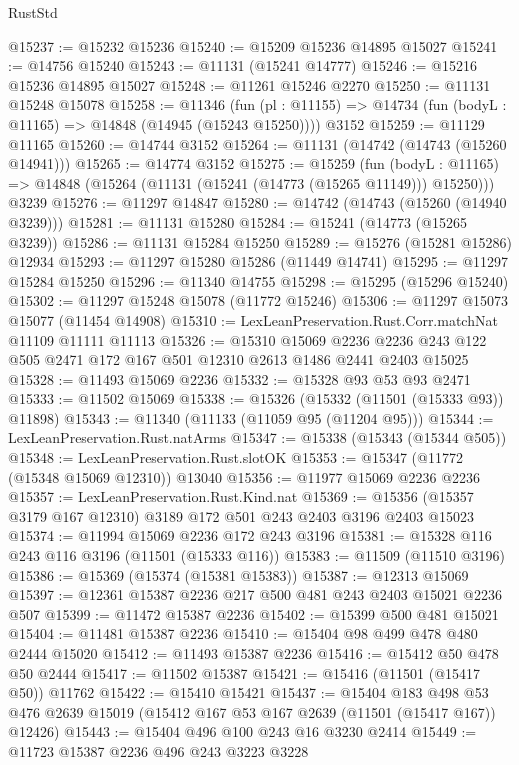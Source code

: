 \begin{lexlean}{RustStd}
\begin{coremodule}
@15237 := @15232 @15236
@15240 := @15209 @15236 @14895 @15027
@15241 := @14756 @15240
@15243 := @11131 (@15241 @14777)
@15246 := @15216 @15236 @14895 @15027
@15248 := @11261 @15246 @2270
@15250 := @11131 @15248 @15078
@15258 := @11346
    (fun (pl : @11155) => @14734 (fun (bodyL : @11165) => @14848 (@14945 (@15243 @15250))))
    @3152
@15259 := @11129 @11165
@15260 := @14744 @3152
@15264 := @11131 (@14742 (@14743 (@15260 @14941)))
@15265 := @14774 @3152
@15275 := @15259
    (fun (bodyL : @11165) => @14848 (@15264 (@11131 (@15241 (@14773 (@15265 @11149))) @15250)))
    @3239
@15276 := @11297 @14847
@15280 := @14742 (@14743 (@15260 (@14940 @3239)))
@15281 := @11131 @15280
@15284 := @15241 (@14773 (@15265 @3239))
@15286 := @11131 @15284 @15250
@15289 := @15276 (@15281 @15286) @12934
@15293 := @11297 @15280 @15286 (@11449 @14741)
@15295 := @11297 @15284 @15250
@15296 := @11340 @14755
@15298 := @15295 (@15296 @15240)
@15302 := @11297 @15248 @15078 (@11772 @15246)
@15306 := @11297 @15073 @15077 (@11454 @14908)
@15310 := LexLeanPreservation.Rust.Corr.matchNat @11109 @11111 @11113
@15326 := @15310
    @15069
    @2236
    @2236
    @243
    @122
    @505
    @2471
    @172
    @167
    @501
    @12310
    @2613
    @1486
    @2441
    @2403
    @15025
@15328 := @11493 @15069 @2236
@15332 := @15328 @93 @53 @93 @2471
@15333 := @11502 @15069
@15338 := @15326 (@15332 (@11501 (@15333 @93)) @11898)
@15343 := @11340 (@11133 (@11059 @95 (@11204 @95)))
@15344 := LexLeanPreservation.Rust.natArms
@15347 := @15338 (@15343 (@15344 @505))
@15348 := LexLeanPreservation.Rust.slotOK
@15353 := @15347 (@11772 (@15348 @15069 @12310)) @13040
@15356 := @11977 @15069 @2236 @2236
@15357 := LexLeanPreservation.Rust.Kind.nat
@15369 := @15356 (@15357 @3179 @167 @12310) @3189 @172 @501 @243 @2403 @3196 @2403 @15023
@15374 := @11994 @15069 @2236 @172 @243 @3196
@15381 := @15328 @116 @243 @116 @3196 (@11501 (@15333 @116))
@15383 := @11509 (@11510 @3196)
@15386 := @15369 (@15374 (@15381 @15383))
@15387 := @12313 @15069
@15397 := @12361 @15387 @2236 @217 @500 @481 @243 @2403 @15021 @2236 @507
@15399 := @11472 @15387 @2236
@15402 := @15399 @500 @481 @15021
@15404 := @11481 @15387 @2236
@15410 := @15404 @98 @499 @478 @480 @2444 @15020
@15412 := @11493 @15387 @2236
@15416 := @15412 @50 @478 @50 @2444
@15417 := @11502 @15387
@15421 := @15416 (@11501 (@15417 @50)) @11762
@15422 := @15410 @15421
@15437 := @15404
    @183
    @498
    @53
    @476
    @2639
    @15019
    (@15412 @167 @53 @167 @2639 (@11501 (@15417 @167)) @12426)
@15443 := @15404 @496 @100 @243 @16 @3230 @2414
@15449 := @11723 @15387 @2236 @496 @243 @3223 @3228

\end{coremodule}
\end{lexlean}
